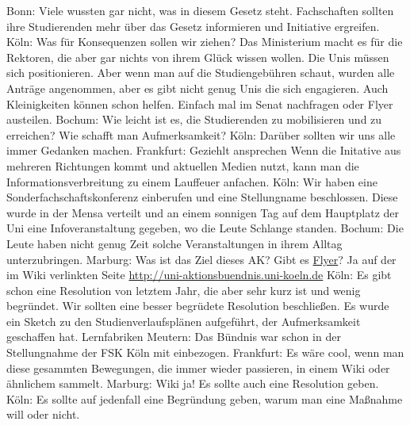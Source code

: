 \begin{outline}
        \1 Bonn: Viele wussten gar nicht, was in diesem Gesetz steht. Fachschaften sollten ihre Studierenden mehr über das Gesetz informieren und Initiative ergreifen.
        \1 Köln: Was für Konsequenzen sollen wir ziehen? Das Ministerium macht es für die Rektoren, die aber gar nichts von ihrem Glück wissen wollen. Die Unis müssen sich positionieren. Aber wenn man auf die Studiengebühren schaut, wurden alle Anträge angenommen, aber es gibt nicht genug Unis die sich engagieren. Auch Kleinigkeiten können schon helfen. Einfach mal im Senat nachfragen oder Flyer austeilen.
        \1 Bochum: Wie leicht ist es, die Studierenden zu mobilisieren und zu erreichen? Wie schafft man Aufmerksamkeit?
        \2 Köln: Darüber sollten wir uns alle immer Gedanken machen.
        \2 Frankfurt: Geziehlt ansprechen
        \2 Wenn die Initative aus mehreren Richtungen kommt und aktuellen Medien nutzt, kann man die Informationsverbreitung zu einem Lauffeuer anfachen.
        \1 Köln: Wir haben eine Sonderfachschaftskonferenz einberufen und eine Stellungname beschlossen. Diese wurde in der Mensa verteilt und an einem sonnigen Tag auf dem Hauptplatz der Uni eine Infoveranstaltung gegeben, wo die Leute Schlange standen.
        \2 Bochum: Die Leute haben nicht genug Zeit solche Veranstaltungen in ihrem Alltag unterzubringen.
        \1 Marburg: Was ist das Ziel dieses AK?
        \1 Gibt es \underline{Flyer}? Ja auf der im Wiki verlinkten Seite \url{http://uni-aktionsbuendnis.uni-koeln.de}
        \1 Köln: Es gibt schon eine Resolution von letztem Jahr, die aber sehr kurz ist und wenig begründet. Wir sollten eine besser begrüdete Resolution beschließen.
        \1 Es wurde ein Sketch zu den Studienverlaufsplänen aufgeführt, der Aufmerksamkeit geschaffen hat.
        \1 Lernfabriken Meutern: Das Bündnis war schon in der Stellungnahme der FSK Köln mit einbezogen.
        \1 Frankfurt: Es wäre cool, wenn man diese gesammten Bewegungen, die immer wieder passieren, in einem Wiki oder ähnlichem sammelt.
        \1 Marburg: Wiki ja! Es sollte auch eine Resolution geben.
        \1 Köln: Es sollte auf jedenfall eine Begründung geben, warum man eine Maßnahme will oder nicht.
      \end{outline}

